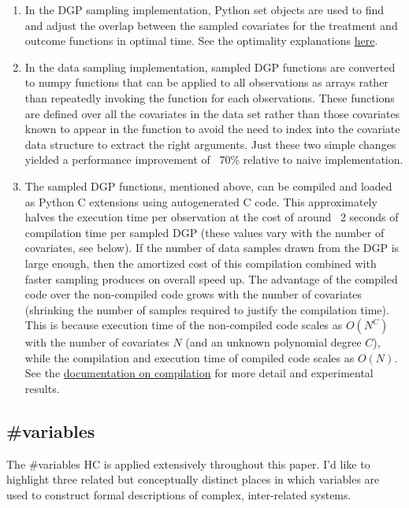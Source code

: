 \documentclass[./main.tex]{subfiles}
\begin{document}
\begin{enumerate}
    \item In the DGP sampling implementation, Python set objects are used to find and adjust the overlap between the sampled covariates for the treatment and outcome functions in optimal time. See the optimality explanations \href{https://wiki.python.org/moin/TimeComplexity}{here}.
    
    \item In the data sampling implementation, sampled DGP functions are converted to numpy functions that can be applied to all observations as arrays rather than repeatedly invoking the function for each observations. These functions are defined over all the covariates in the data set rather than those covariates known to appear in the function to avoid the need to index into the covariate data structure to extract the right arguments. Just these two simple changes yielded a performance improvement of ~70\% relative to naive implementation.
    
    \item The sampled DGP functions, mentioned above, can be compiled and loaded as Python C extensions using autogenerated C code. This approximately halves the execution time per observation at the cost of around ~2 seconds of compilation time per sampled DGP (these values vary with the number of covariates, see below). If the number of data samples drawn from the DGP is large enough, then the amortized cost of this compilation combined with faster sampling produces on overall speed up. The advantage of the compiled code over the non-compiled code grows with the number of covariates (shrinking the number of samples required to justify the compilation time). This is because execution time of the non-compiled code scales as $O(N^C)$ with the number of covariates $N$ (and an unknown polynomial degree $C$), while the compilation and execution time of compiled code scales as $O(N)$. See the \href{\RTDurl/advanced/parallelization.html}{documentation on compilation} for more detail and experimental results.
    
\end{enumerate}


\subsection*{\textbf{\#variables}}
\label{hc:variables}

The \#variables HC is applied extensively throughout this paper. I'd like to highlight three related but conceptually distinct places in which variables are used to construct formal descriptions of complex, inter-related systems.
\end{document}
